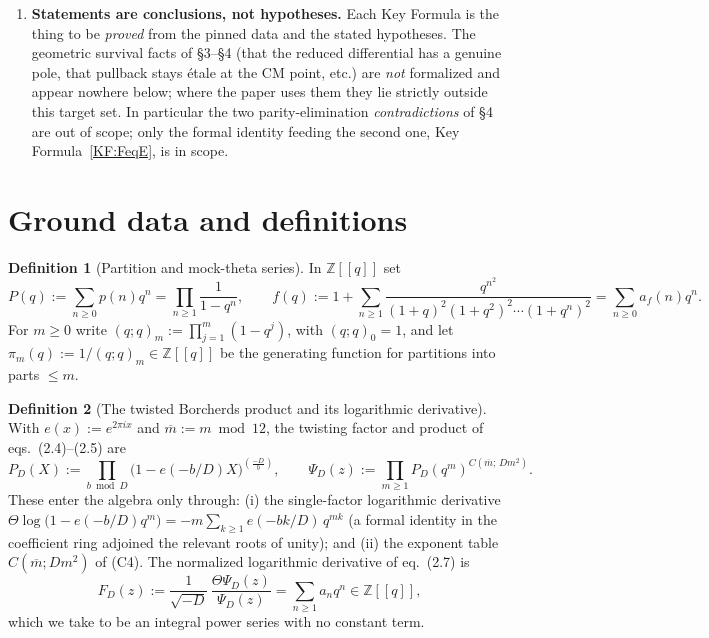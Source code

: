 \documentclass[11pt]{article}
\newcommand{\Z}{\mathbb{Z}}
\newcommand{\leg}[2]{\left(\frac{#1}{#2}\right)}
\theoremstyle{definition}
\newtheorem{defn}{Definition}
\begin{document}
\begin{enumerate}
\item[(C7)] \textbf{Statements are conclusions, not hypotheses.} Each Key Formula is the thing to
be \emph{proved} from the pinned data and the stated hypotheses. The geometric survival facts of
\S3--\S4 (that the reduced differential has a genuine pole, that pullback stays \'etale at the CM
point, etc.) are \emph{not} formalized and appear nowhere below; where the paper uses them they
lie strictly outside this target set. In particular the two parity-elimination
\emph{contradictions} of \S4 are out of scope; only the formal identity feeding the second one,
Key Formula~\ref{KF:FeqE}, is in scope.
\end{enumerate}

\section*{Ground data and definitions}

\begin{defn}[Partition and mock-theta series]\label{def:series}
In $\Z[[q]]$ set
\[
P(q):=\sum_{n\ge0}p(n)q^n=\prod_{n\ge1}\frac{1}{1-q^n},
\qquad
f(q):=1+\sum_{n\ge1}\frac{q^{n^2}}{(1+q)^2(1+q^2)^2\cdots(1+q^n)^2}=\sum_{n\ge0}a_f(n)q^n.
\]
For $m\ge0$ write $(q;q)_m:=\prod_{j=1}^m(1-q^j)$, with $(q;q)_0=1$, and let
$\pi_m(q):=1/(q;q)_m\in\Z[[q]]$ be the generating function for partitions into parts $\le m$.
\end{defn}

\begin{defn}[The twisted Borcherds product and its logarithmic derivative]\label{def:psi}
With $e(x):=e^{2\pi ix}$ and $\overline m:=m\bmod12$, the twisting factor and product of
eqs.~(2.4)--(2.5) are
\[
P_D(X):=\prod_{b\bmod D}\bigl(1-e(-b/D)X\bigr)^{\leg{-D}{b}},
\qquad
\Psi_D(z):=\prod_{m\ge1}P_D(q^m)^{C(\overline m;\,Dm^2)}.
\]
These enter the algebra only through: (i) the single-factor logarithmic derivative
$\Theta\log\bigl(1-e(-b/D)q^m\bigr)=-m\sum_{k\ge1}e(-bk/D)\,q^{mk}$ (a formal identity in the
coefficient ring adjoined the relevant roots of unity); and (ii) the exponent table $C(\overline
m;Dm^2)$ of (C4). The normalized logarithmic derivative of eq.~(2.7) is
\[
F_D(z):=\frac{1}{\sqrt{-D}}\,\frac{\Theta\Psi_D(z)}{\Psi_D(z)}=\sum_{n\ge1}a_nq^n\in\Z[[q]],
\]
which we take to be an integral power series with no constant term.
\end{defn}
\end{document}
